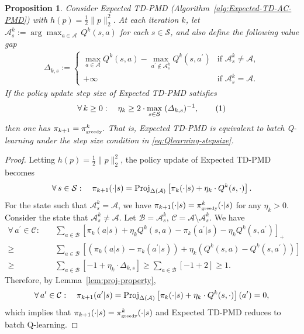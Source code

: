 \documentclass[10pt]{article}
\newcommand{\Proj}{\textup{Proj}}
\newcommand{\calA}{\mathcal{A}}
\newcommand{\calS}{\mathcal{S}}
\newcommand{\ls}{\left}
\newcommand{\rs}{\right}
\newcommand\numberthis{\addtocounter{equation}{1}\tag{\theequation}}
\theoremstyle{plain}
\newtheorem{proposition}[theorem]{Proposition}
\theoremstyle{definition}
\begin{document}
\begin{proposition}
    Consider Expected TD-PMD \textup{(}Algorithm~\ref{alg:Expected-TD-AC-PMD}\textup{)} with $h(p)=\frac{1}{2} \| p \|_2^2$. At each iteration $k$,  let $\calA^k_s := \arg\max_{a\in\calA} \, Q^k(s,a)$ for each  $s\in\calS$, and also define the following value gap
    \begin{align*}
        \varDelta_{k,s} := \begin{cases}
            \max_{a\in\calA} Q^k(s,a) - \max_{a^\prime\not\in\calA^k_s} Q^k(s,a^\prime) & \mbox{if } \calA^k_s \neq \calA, \\
            +\infty & \mbox{if } \calA^k_s = \calA.
        \end{cases}
    \end{align*}
    If the policy update step size of Expected TD-PMD satisfies
    \begin{align*}
        \forall\, k\geq 0 : \quad \eta_k \geq 2\cdot\max_{s\in\calS} \; (\varDelta_{k,s})^{-1},\numberthis\label{eq:Qlearning-stepsize}
    \end{align*}
    then one has
    $
        \pi_{k+1} = \pi^k_{\mbox{\tiny greedy}}.
    $
    That is, Expected TD-PMD is equivalent to batch Q-learning under the step size condition in \eqref{eq:Qlearning-stepsize}.
    \label{pro:Expected-TD-AC-PMD:equivalence}
\end{proposition}

\begin{proof}
    Letting $h(p)=\frac{1}{2}\| p \|_2^2$, the policy update of Expected TD-PMD becomes
    \begin{align*}
        \forall\, s\in\calS: \quad \pi_{k+1}(\cdot|s) = \Proj_{\Delta(\calA)} \ls[ \pi_k(\cdot|s) + \eta_k \cdot Q^k(s,\cdot) \rs].
    \end{align*}
    For the state such that $\calA^k_s = \calA$,  we have $\pi_{k+1}(\cdot|s)=\pi^k_{\mbox{\tiny greedy}}(\cdot|s)$ for any $\eta_ k > 0$. Consider the state that $\calA^k_s \neq \calA$. Let $\mathcal{B} = \calA^k_s$, $\mathcal{C} = \calA \setminus \calA^k_s$. We have
    \begin{align*}
        \forall\, a^\prime \in \mathcal{C}: \quad  &\sum_{a\in\mathcal{B}} \ls[ \pi_k(a|s) + \eta_k Q^k(s,a) - \pi_k(a^\prime | s) - \eta_k Q^k(s,a^\prime) \rs]_+ \\
        \geq &\sum_{a\in\mathcal{B}} \ls[ (\pi_k(a|s) - \pi_k(a^\prime | s)) + \eta_k \ls( Q^k(s,a) - Q^k(s,a^\prime) \rs) \rs] \\
        \geq &\sum_{a\in\mathcal{B}}\ls[ -1 + \eta_k \cdot \varDelta_{k,s} \rs] \geq \sum_{a\in\mathcal{B}} [-1+2] \geq 1.
    \end{align*}
    Therefore, by Lemma~\ref{lem:proj-property},
    \begin{align*}
        \forall\, a^\prime\in\mathcal{C}: \quad \pi_{k+1}(a^\prime | s) = \Proj_{\Delta(\calA)} \ls[ \pi_k(\cdot | s) + \eta_k\cdot Q^k(s,\cdot) \rs](a^\prime) = 0,
    \end{align*}
    which implies that $\pi_{k+1}(\cdot | s) = \pi^k_{\mbox{\tiny greedy}}(\cdot | s)$ and Expected TD-PMD reduces to batch Q-learning.
\end{proof}
\end{document}

